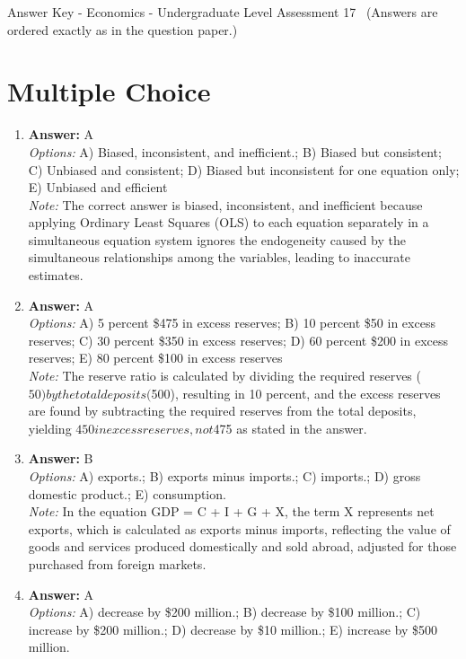 \documentclass[12pt]{article}
\begin{document}
\begin{center}
Answer Key - Economics - Undergraduate Level Assessment 17 \
\small (Answers are ordered exactly as in the question paper.)
\end{center}

\section*{Multiple Choice}
\begin{enumerate}[label=\arabic*.]
\item \textbf{Answer:} A
\\ \textit{Options:} A) Biased, inconsistent, and inefficient.; B) Biased but consistent; C) Unbiased and consistent; D) Biased but inconsistent for one equation only; E) Unbiased and efficient
\\ \textit{Note:} The correct answer is biased, inconsistent, and inefficient because applying Ordinary Least Squares (OLS) to each equation separately in a simultaneous equation system ignores the endogeneity caused by the simultaneous relationships among the variables, leading to inaccurate estimates.
\item \textbf{Answer:} A
\\ \textit{Options:} A) 5 percent \$475 in excess reserves; B) 10 percent \$50 in excess reserves; C) 30 percent \$350 in excess reserves; D) 60 percent \$200 in excess reserves; E) 80 percent \$100 in excess reserves
\\ \textit{Note:} The reserve ratio is calculated by dividing the required reserves ($50) by the total deposits ($500), resulting in 10 percent, and the excess reserves are found by subtracting the required reserves from the total deposits, yielding $450 in excess reserves, not $475 as stated in the answer.
\item \textbf{Answer:} B
\\ \textit{Options:} A) exports.; B) exports minus imports.; C) imports.; D) gross domestic product.; E) consumption.
\\ \textit{Note:} In the equation GDP = C + I + G + X, the term X represents net exports, which is calculated as exports minus imports, reflecting the value of goods and services produced domestically and sold abroad, adjusted for those purchased from foreign markets.
\item \textbf{Answer:} A
\\ \textit{Options:} A) decrease by \$200 million.; B) decrease by \$100 million.; C) increase by \$200 million.; D) decrease by \$10 million.; E) increase by \$500 million.

\end{enumerate}
\end{document}
